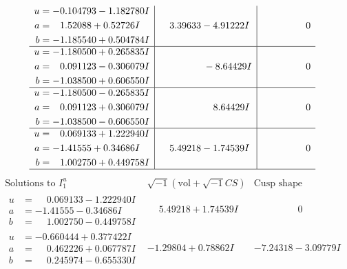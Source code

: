 \documentclass[1p]{elsarticle_modified}
\theoremstyle{definition}
\newcommand{\I}{\sqrt{-1}}
\begin{document}
$$\begin{array}{c|c|c}
\begin{aligned}
u &= -0.104793 - 1.182780 I \\
a &= \phantom{-}1.52088 + 0.52726 I \\
b &= -1.185540 + 0.504784 I\end{aligned}
 & \phantom{-}3.39633 - 4.91222 I & \phantom{-0.000000 } 0 \\ \hline\begin{aligned}
u &= -1.180500 + 0.265835 I \\
a &= \phantom{-}0.091123 - 0.306079 I \\
b &= -1.038500 + 0.606550 I\end{aligned}
 & \phantom{-0.000000 } -8.64429 I & \phantom{-0.000000 } 0 \\ \hline\begin{aligned}
u &= -1.180500 - 0.265835 I \\
a &= \phantom{-}0.091123 + 0.306079 I \\
b &= -1.038500 - 0.606550 I\end{aligned}
 & \phantom{-0.000000 -}8.64429 I & \phantom{-0.000000 } 0 \\ \hline\begin{aligned}
u &= \phantom{-}0.069133 + 1.222940 I \\
a &= -1.41555 + 0.34686 I \\
b &= \phantom{-}1.002750 + 0.449758 I\end{aligned}
 & \phantom{-}5.49218 - 1.74539 I & \phantom{-0.000000 } 0\\
 \hline 
 \end{array}$$\newpage$$\begin{array}{c|c|c}  
\text{Solutions to }I^u_{1}& \I (\text{vol} + \sqrt{-1}CS) & \text{Cusp shape}\\
 \hline 
\begin{aligned}
u &= \phantom{-}0.069133 - 1.222940 I \\
a &= -1.41555 - 0.34686 I \\
b &= \phantom{-}1.002750 - 0.449758 I\end{aligned}
 & \phantom{-}5.49218 + 1.74539 I & \phantom{-0.000000 } 0 \\ \hline\begin{aligned}
u &= -0.660444 + 0.377422 I \\
a &= \phantom{-}0.462226 + 0.067787 I \\
b &= \phantom{-}0.245974 - 0.655330 I\end{aligned}
 & -1.29804 + 0.78862 I & -7.24318 - 3.09779 I \\ \hline\begin{aligned}

\end{aligned}
\end{array}$$
\end{document}
